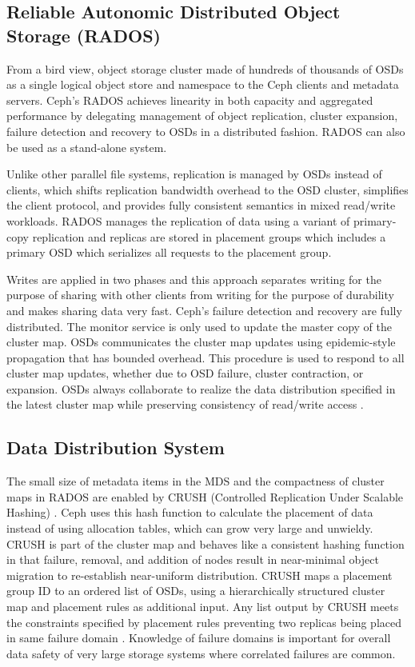 \documentclass[9pt,twocolumn,twoside]{../../styles/osajnl}
\begin{document}
\subsection{Reliable Autonomic Distributed Object Storage (RADOS)}
From a bird view, object storage cluster made of hundreds of thousands
of OSDs as a single logical object store and namespace to the Ceph
clients and metadata servers. Ceph’s RADOS achieves linearity in both
capacity and aggregated performance by delegating management of object
replication, cluster expansion, failure detection and recovery to OSDs
in a distributed fashion. RADOS can also be used as a stand-alone
system.

Unlike other parallel file systems, replication is managed by OSDs
instead of clients, which shifts replication bandwidth overhead to the
OSD cluster, simplifies the client protocol, and provides fully
consistent semantics in mixed read/write workloads. RADOS manages the
replication of data using a variant of primary-copy replication and
replicas are stored in placement groups which includes a primary OSD
which serializes all requests to the placement group.

Writes are applied in two phases and this approach separates writing
for the purpose of sharing with other clients from writing for the
purpose of durability and makes sharing data very fast. Ceph’s failure
detection and recovery are fully distributed. The monitor service is
only used to update the master copy of the cluster map. OSDs
communicates the cluster map updates using epidemic-style propagation
that has bounded overhead. This procedure is used to respond to all
cluster map updates, whether due to OSD failure, cluster contraction,
or expansion. OSDs always collaborate to realize the data distribution
specified in the latest cluster map while preserving consistency of
read/write access \cite{paper-ceph-hadoop}.

\subsection{Data Distribution System}
The small size of metadata items in the MDS and the compactness of
cluster maps in RADOS are enabled by CRUSH (Controlled Replication
Under Scalable Hashing) \cite{MDS}. Ceph uses this hash function to
calculate the placement of data instead of using allocation tables,
which can grow very large and unwieldy. CRUSH is part of the cluster
map and behaves like a consistent hashing function in that failure,
removal, and addition of nodes result in near-minimal object migration
to re-establish near-uniform distribution. CRUSH maps a placement
group ID to an ordered list of OSDs, using a hierarchically structured
cluster map and placement rules as additional input. Any list output
by CRUSH meets the constraints specified by placement rules preventing
two replicas being placed in same failure domain
\cite{paper-Ceph}. Knowledge of failure domains is important for
overall data safety of very large storage systems where correlated
failures are common.
\end{document}

